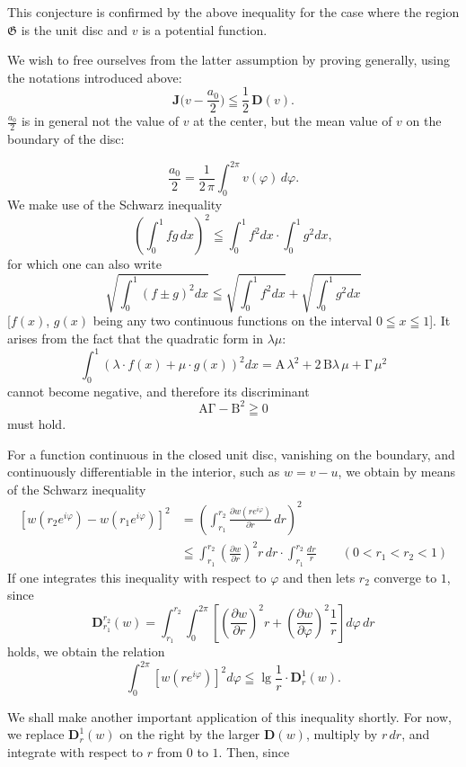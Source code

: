 \documentclass{article}
\begin{document}
This conjecture is confirmed by the above inequality for the case where the region $\mathfrak{G}$ is the unit disc and $v$ is a potential function.

We wish to free ourselves from the latter assumption by proving generally, using the notations introduced above:
\[ \mathbf{J}\Big( v - \frac{a_0}{2} \Big) \leqq \frac{1}{2}\,\mathbf{D}(v). \tag{25} \]
$\frac{a_0}{2}$ is in general not the value of $v$ at the center, but the mean value of $v$ on the boundary of the disc:

\[ \frac{a_0}{2} = \frac{1}{2\,\pi} \int_0^{2\pi} v(\varphi)\,d\varphi. \]
We make use of the Schwarz inequality
\[ \left( \int_0^1 fg\,dx \right)^2 \leqq \int_0^1 f^2 dx \cdot \int_0^1 g^2 dx, \]
for which one can also write
\[ \sqrt{\int_0^1 (f \pm g)^2 dx} \leqq \sqrt{\int_0^1 f^2 dx} + \sqrt{\int_0^1 g^2 dx} \]
[$f(x)$, $g(x)$ being any two continuous functions on the interval $0 \leqq x \leqq 1$]. It arises from the fact that the quadratic form in $\lambda\mu$:
\[ \int_0^1 (\lambda \cdot f(x) + \mu \cdot g(x))^2 dx = \mathrm{A}\,\lambda^2 + 2\,\mathrm{B}\lambda\,\mu + \mathrm{\Gamma}\,\mu^2 \]
cannot become negative, and therefore its discriminant
\[ \mathrm{A}\mathrm{\Gamma} - \mathrm{B}^2 \geqq 0 \]
must hold.

For a function continuous in the closed unit disc, vanishing on the boundary, and continuously differentiable in the interior, such as $w = v - u$, we obtain by means of the Schwarz inequality
\[ \begin{aligned}
[w(r_2 e^{i\varphi}) - w(r_1 e^{i\varphi})]^2 &= \left( \int_{r_1}^{r_2} \frac{\partial w(r e^{i\varphi})}{\partial r}\,dr \right)^2 \\
&\leqq \int_{r_1}^{r_2} \left(\frac{\partial w}{\partial r}\right)^2 r\,dr \cdot \int_{r_1}^{r_2} \frac{dr}{r} \qquad (0 < r_1 < r_2 < 1)
\end{aligned} \]
If one integrates this inequality with respect to $\varphi$ and then lets $r_2$ converge to $1$, since
\[ \mathbf{D}_{r_1}^{r_2}(w) = \int_{r_1}^{r_2} \int_0^{2\pi} \left[ \left(\frac{\partial w}{\partial r}\right)^2 r + \left(\frac{\partial w}{\partial \varphi}\right)^2 \frac{1}{r} \right] d\varphi\,dr \]
holds, we obtain the relation
\[ \int_0^{2\pi} [w(r e^{i\varphi})]^2 d\varphi \leqq \lg\frac{1}{r} \cdot \mathbf{D}_r^1(w). \tag{26} \]

We shall make another important application of this inequality shortly. For now, we replace $\mathbf{D}_r^1(w)$ on the right by the larger $\mathbf{D}(w)$, multiply by $r\,dr$, and integrate with respect to $r$ from $0$ to $1$. Then, since
\end{document}

